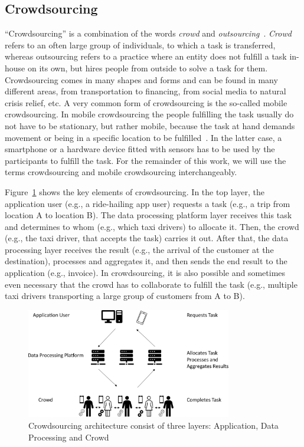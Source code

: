 \subsection*{Crowdsourcing}
``Crowdsourcing'' is a combination of the words \textit{crowd} and \textit{outsourcing}~\cite{howe2006rise}.
\textit{Crowd} refers to an often large group of individuals, to which a task is transferred, whereas outsourcing refers to a practice where an entity does not fulfill a task in-house on its own, but hires people from outside to solve a task for them.
Crowdsourcing comes in many shapes and forms and can be found in many different areas, from transportation to financing, from social media to natural crisis relief, etc.
A very common form of crowdsourcing is the so-called mobile crowdsourcing.
In mobile crowdsourcing the people fulfilling the task usually do not have to be stationary, but rather mobile, because the task at hand demands movement or being in a specific location to be fulfilled~\cite{phuttharak2018review}.
In the latter case, a smartphone or a hardware device fitted with sensors has to be used by the participants to fulfill the task.
For the remainder of this work, we will use the terms crowdsourcing and mobile crowdsourcing interchangeably.

Figure~\ref{fig:crowdsourcing_architecture} shows the key elements of crowdsourcing.
In the top layer, the application user (e.g., a ride-hailing app user) requests a task (e.g., a trip from location A to location B).
The data processing platform layer receives this task and determines to whom (e.g., which taxi drivers) to allocate it.
Then, the crowd (e.g., the taxi driver, that accepts the task) carries it out.
After that, the data processing layer receives the result (e.g., the arrival of the customer at the destination), processes and aggregates it, and then sends the end result to the application (e.g., invoice).
In crowdsourcing, it is also possible and sometimes even necessary that the crowd has to collaborate to fulfill the task (e.g., multiple taxi drivers transporting a large group of customers from A to B).

\begin{figure}%
  \centering
  \includegraphics[width=0.8\textwidth]{fig/crowdsourcing.pdf}
  \caption{Crowdsourcing architecture consist of three layers: Application, Data Processing and Crowd}
  \label{fig:crowdsourcing_architecture}
\end{figure}

